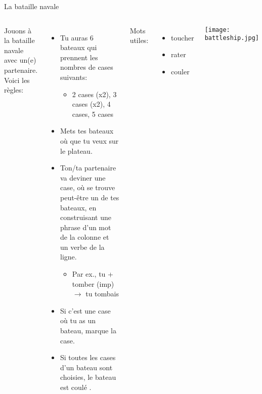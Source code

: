 \begin{frame}{La bataille navale}
  \scriptsize
    \begin{columns}
        Jouons à la bataille navale avec un(e) partenaire.
        Voici les règles:
        \begin{itemize}
          \item Tu auras 6 bateaux qui prennent les nombres de cases  suivants:
          \begin{itemize}
            \scriptsize
            \item 2 cases (x2), 3 cases (x2), 4 cases, 5 cases
          \end{itemize}
          \item Mets tes bateaux où que  tu veux sur le plateau.
          \item Ton/ta partenaire va deviner une case, où se trouve peut-être un de tes bateaux, en construisant une phrase d'un mot de la colonne et un verbe de la ligne.
          \begin{itemize}
            \scriptsize
            \item Par ex., tu + tomber (imp) $\to$ tu tombais
          \end{itemize}
          \item Si c'est une case où tu as un bateau, marque la case.
          \item Si toutes les cases d'un bateau sont choisies, le bateau est coulé .
          \end{itemize}
        \small
        Mots utiles:
        \begin{itemize}
          \item toucher 
          \item rater 
          \item couler 
        \end{itemize}
        \texttt{[image: battleship.jpg]}
    \end{columns}
\end{frame}